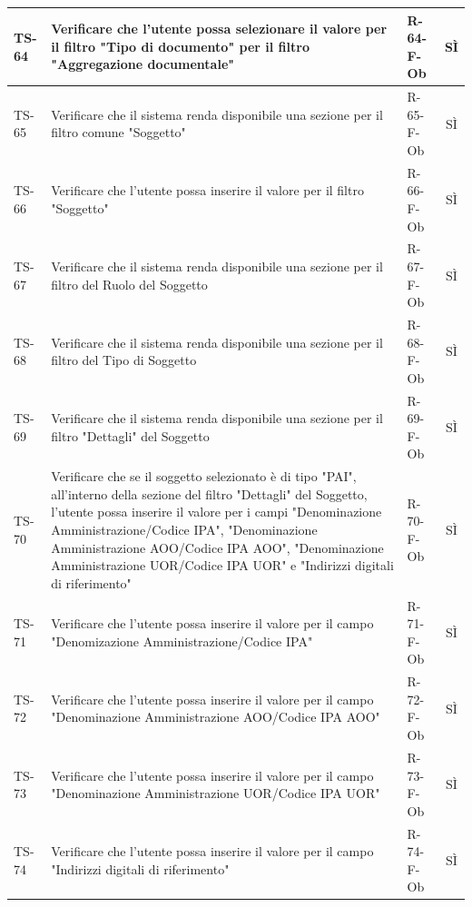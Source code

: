 \documentclass[a4paper,12pt]{article}
\begin{document}
\begin{longtable}{|p{1.5cm}|p{8.3cm}|p{2.4cm}|c|}
TS-64 & Verificare che l'utente possa selezionare il valore per il filtro "Tipo di documento" per il filtro "Aggregazione documentale" & R-64-F-Ob & SÌ \\
\hline
TS-65 & Verificare che il sistema renda disponibile una sezione per il filtro comune "Soggetto" & R-65-F-Ob & SÌ \\
\hline
TS-66 & Verificare che l'utente possa inserire il valore per il filtro "Soggetto" & R-66-F-Ob & SÌ \\
\hline
TS-67 & Verificare che il sistema renda disponibile una sezione per il filtro del Ruolo del Soggetto & R-67-F-Ob & SÌ \\
\hline
TS-68 & Verificare che il sistema renda disponibile una sezione per il filtro del Tipo di Soggetto & R-68-F-Ob & SÌ \\
\hline
TS-69 & Verificare che il sistema renda disponibile una sezione per il filtro "Dettagli" del Soggetto & R-69-F-Ob & SÌ \\
\hline
TS-70 & Verificare che se il soggetto selezionato è di tipo "PAI", all'interno della sezione del filtro "Dettagli" del Soggetto, l'utente possa inserire il valore per i campi "Denominazione Amministrazione/Codice IPA", "Denominazione Amministrazione AOO/Codice IPA AOO", "Denominazione Amministrazione UOR/Codice IPA UOR" e "Indirizzi digitali di riferimento" & R-70-F-Ob & SÌ \\
\hline
TS-71 & Verificare che l'utente possa inserire il valore per il campo "Denomizazione Amministrazione/Codice IPA" & R-71-F-Ob & SÌ \\
\hline
TS-72 & Verificare che l'utente possa inserire il valore per il campo "Denominazione Amministrazione AOO/Codice IPA AOO" & R-72-F-Ob & SÌ \\
\hline
TS-73 & Verificare che l'utente possa inserire il valore per il campo "Denominazione Amministrazione UOR/Codice IPA UOR" & R-73-F-Ob & SÌ \\
\hline
TS-74 & Verificare che l'utente possa inserire il valore per il campo "Indirizzi digitali di riferimento" & R-74-F-Ob & SÌ \\


\end{longtable}
\end{document}
